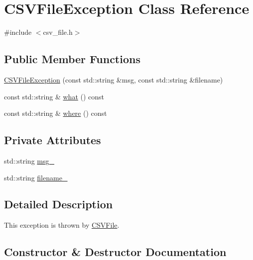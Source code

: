 \hypertarget{classCSVFileException}{}\section{C\+S\+V\+File\+Exception Class Reference}
\label{classCSVFileException}


{\ttfamily \#include $<$csv\+\_\+file.\+h$>$}

\subsection*{Public Member Functions}
\begin{DoxyCompactItemize}
\item 
\hyperlink{classCSVFileException_a62484514471ec81e8cc1b416fa06ed9f}{C\+S\+V\+File\+Exception} (const std\+::string \&msg, const std\+::string \&filename)
\item 
const std\+::string \& \hyperlink{classCSVFileException_aa317994046e9069c9622df37aad338de}{what} () const 
\item 
const std\+::string \& \hyperlink{classCSVFileException_afd704b1d0d6c557cd1dc67106fc1b189}{where} () const 
\end{DoxyCompactItemize}
\subsection*{Private Attributes}
\begin{DoxyCompactItemize}
\item 
std\+::string \hyperlink{classCSVFileException_ae1b104a3cff93917fd2c9ddac20b63f1}{msg\+\_\+}
\item 
std\+::string \hyperlink{classCSVFileException_adcd620025e1390e0fe83486da41b15de}{filename\+\_\+}
\end{DoxyCompactItemize}


\subsection{Detailed Description}
This exception is thrown by \hyperlink{classCSVFile}{C\+S\+V\+File}. 

\subsection{Constructor \& Destructor Documentation}
\hypertarget{classCSVFileException_a62484514471ec81e8cc1b416fa06ed9f}{}
